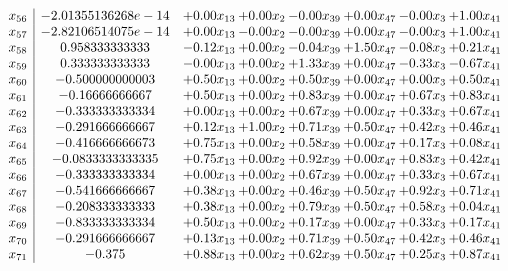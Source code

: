 \documentclass[8pt]{article}
\begin{document}
\[\begin{array}{c| c c@{\hskip 2pt} c@{\hskip 2pt} c@{\hskip 2pt} c@{\hskip 2pt} c@{\hskip 2pt} c@{\hskip 2pt} }
 x_{56}   &  -2.01355136268e-14 & +  0.00 x_{13} & +  0.00 x_{2} & -0.00 x_{39} & +  0.00 x_{47} & -0.00 x_{3} & +  1.00 x_{41}\\
 x_{57}   &  -2.82106514075e-14 & +  0.00 x_{13} & -0.00 x_{2} & -0.00 x_{39} & +  0.00 x_{47} & -0.00 x_{3} & +  1.00 x_{41}\\
 x_{58}   &  0.958333333333 & -0.12 x_{13} & +  0.00 x_{2} & -0.04 x_{39} & +  1.50 x_{47} & -0.08 x_{3} & +  0.21 x_{41}\\
 x_{59}   &  0.333333333333 & -0.00 x_{13} & +  0.00 x_{2} & +  1.33 x_{39} & +  0.00 x_{47} & -0.33 x_{3} & -0.67 x_{41}\\
 x_{60}   &  -0.500000000003 & +  0.50 x_{13} & +  0.00 x_{2} & +  0.50 x_{39} & +  0.00 x_{47} & +  0.00 x_{3} & +  0.50 x_{41}\\
 x_{61}   &  -0.16666666667 & +  0.50 x_{13} & +  0.00 x_{2} & +  0.83 x_{39} & +  0.00 x_{47} & +  0.67 x_{3} & +  0.83 x_{41}\\
 x_{62}   &  -0.333333333334 & +  0.00 x_{13} & +  0.00 x_{2} & +  0.67 x_{39} & +  0.00 x_{47} & +  0.33 x_{3} & +  0.67 x_{41}\\
 x_{63}   &  -0.291666666667 & +  0.12 x_{13} & +  1.00 x_{2} & +  0.71 x_{39} & +  0.50 x_{47} & +  0.42 x_{3} & +  0.46 x_{41}\\
 x_{64}   &  -0.416666666673 & +  0.75 x_{13} & +  0.00 x_{2} & +  0.58 x_{39} & +  0.00 x_{47} & +  0.17 x_{3} & +  0.08 x_{41}\\
 x_{65}   &  -0.0833333333335 & +  0.75 x_{13} & +  0.00 x_{2} & +  0.92 x_{39} & +  0.00 x_{47} & +  0.83 x_{3} & +  0.42 x_{41}\\
 x_{66}   &  -0.333333333334 & +  0.00 x_{13} & +  0.00 x_{2} & +  0.67 x_{39} & +  0.00 x_{47} & +  0.33 x_{3} & +  0.67 x_{41}\\
 x_{67}   &  -0.541666666667 & +  0.38 x_{13} & +  0.00 x_{2} & +  0.46 x_{39} & +  0.50 x_{47} & +  0.92 x_{3} & +  0.71 x_{41}\\
 x_{68}   &  -0.208333333333 & +  0.38 x_{13} & +  0.00 x_{2} & +  0.79 x_{39} & +  0.50 x_{47} & +  0.58 x_{3} & +  0.04 x_{41}\\
 x_{69}   &  -0.833333333334 & +  0.50 x_{13} & +  0.00 x_{2} & +  0.17 x_{39} & +  0.00 x_{47} & +  0.33 x_{3} & +  0.17 x_{41}\\
 x_{70}   &  -0.291666666667 & +  0.13 x_{13} & +  0.00 x_{2} & +  0.71 x_{39} & +  0.50 x_{47} & +  0.42 x_{3} & +  0.46 x_{41}\\
 x_{71}   &  -0.375 & +  0.88 x_{13} & +  0.00 x_{2} & +  0.62 x_{39} & +  0.50 x_{47} & +  0.25 x_{3} & +  0.87 x_{41}\\

\end{array}\]
\end{document}
